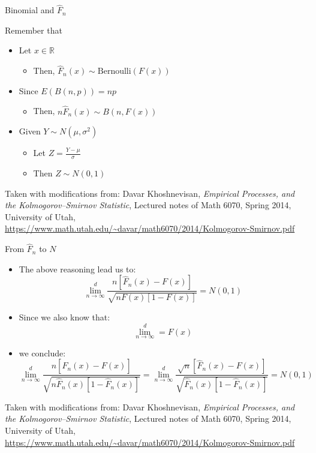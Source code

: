 \documentclass{beamer}
\begin{document}
\begin{frame}
{\centerline{Binomial and $\widehat {F}_{n}$}}
Remember that
\begin{itemize}
\item Let $x \in \mathbb{R}$
\begin{itemize}
\item Then, $ \widehat {F}_{n} (x) \sim \text{Bernoulli}(F(x))$
\end{itemize}
\item Since $E(B(n,p))=np$
\begin{itemize}
\item Then, $n \widehat {F}_{n} (x) \sim B(n,F(x))$
\end{itemize}
\item Given $Y \sim N(\mu,\sigma^2)$ 
\begin{itemize}
\item Let $ Z = \frac{Y - \mu}{\sigma}$
\item Then $Z \sim N(0,1)$
\end{itemize}

\end{itemize}

\begin{center}
\tiny{Taken with modifications from: Davar Khoshnevisan, \textit{Empirical Processes, and the Kolmogorov–Smirnov Statistic}, Lectured notes of Math 6070, Spring 2014, University of Utah, \url{https://www.math.utah.edu/~davar/math6070/2014/Kolmogorov-Smirnov.pdf}}
\end{center}

\end{frame}


\begin{frame}
{\centerline{From $\widehat {F}_{n}$ to $N$}}
\begin{itemize}
\item The above reasoning lead us to:
$$\lim_{n \to \infty}^{d} \frac{n \left [\widehat {F}_{n} (x) - F(x) \right ]}{\sqrt{nF(x)\left [ 1 - F(x) \right ]}} = N(0,1)$$
\item Since we also know that:
$$ \lim_{n \to \infty}^{d}  = F(x) $$
\item we conclude:
 $$\lim_{n \to \infty}^{d} \frac{n \left [\widehat {F}_{n} (x) - F(x) \right ]}{\sqrt{n\widehat {F}_{n}(x)\left [ 1 - \widehat {F}_{n}(x) \right ]}} = 
 \lim_{n \to \infty}^{d} \frac{\sqrt{n} \left [\widehat {F}_{n} (x) - F(x) \right ]}{\sqrt{\widehat {F}_{n}(x)\left [ 1 - \widehat {F}_{n}(x) \right ]}} = 
 N(0,1)$$


\end{itemize}

\begin{center}
\tiny{Taken with modifications from: Davar Khoshnevisan, \textit{Empirical Processes, and the Kolmogorov–Smirnov Statistic}, Lectured notes of Math 6070, Spring 2014, University of Utah, \url{https://www.math.utah.edu/~davar/math6070/2014/Kolmogorov-Smirnov.pdf}}
\end{center}

\end{frame}
\end{document}
